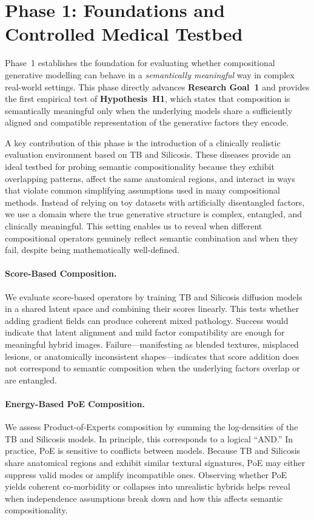 \section{Phase 1: Foundations and Controlled Medical Testbed}

Phase~1 establishes the foundation for evaluating whether compositional generative
modelling can behave in a \textit{semantically meaningful} way in complex real-world
settings. This phase directly advances \textbf{Research Goal~1} and provides the
first empirical test of \textbf{Hypothesis~H1}, which states that composition is
semantically meaningful only when the underlying models share a sufficiently aligned
and compatible representation of the generative factors they encode.

A key contribution of this phase is the introduction of a clinically realistic
evaluation environment based on TB and Silicosis. These diseases provide an ideal
testbed for probing semantic compositionality because they exhibit overlapping
patterns, affect the same anatomical regions, and interact in ways that violate
common simplifying assumptions used in many compositional methods. Instead of relying
on toy datasets with artificially disentangled factors, we use a domain where the
true generative structure is complex, entangled, and clinically meaningful. This
setting enables us to reveal when different compositional operators genuinely reflect
semantic combination and when they fail, despite being mathematically well-defined.

\paragraph{Score-Based Composition.}
We evaluate score-based operators by training TB and Silicosis diffusion models in a
shared latent space and combining their scores linearly. This tests whether adding
gradient fields can produce coherent mixed pathology. Success would indicate that
latent alignment and mild factor compatibility are enough for meaningful hybrid
images. Failure—manifesting as blended textures, misplaced lesions, or anatomically
inconsistent shapes—indicates that score addition does not correspond to semantic
composition when the underlying factors overlap or are entangled.

\paragraph{Energy-Based PoE Composition.}
We assess Product-of-Experts composition by summing the log-densities of the TB and
Silicosis models. In principle, this corresponds to a logical “AND.” In practice,
PoE is sensitive to conflicts between models. Because TB and Silicosis share
anatomical regions and exhibit similar textural signatures, PoE may either suppress
valid modes or amplify incompatible ones. Observing whether PoE yields coherent
co-morbidity or collapses into unrealistic hybrids helps reveal when independence
assumptions break down and how this affects semantic compositionality.

